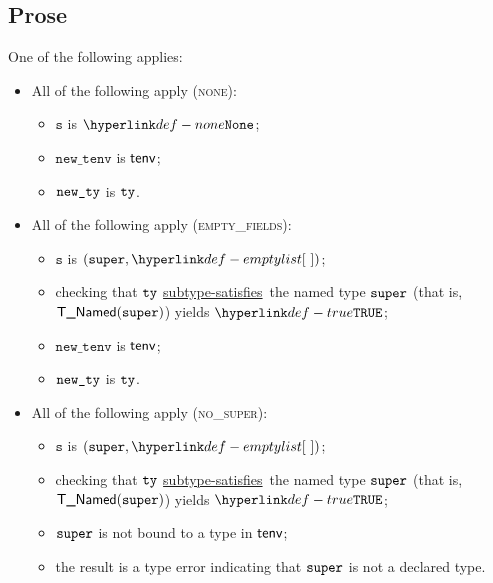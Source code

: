 \documentclass{book}
\newcommand\ProseOrTypeError[0]{\ProseTerminateAs{\TypeErrorConfig}}
\newcommand\subtypesatisfies[0]{\hyperlink{def-subtypesatisfies}{subtype-satisfies}}
\newcommand\newtenv[0]{\texttt{new\_tenv}}
\newcommand\vs[0]{\texttt{s}}
\begin{document}
\subsection{Prose}
One of the following applies:
\begin{itemize}
  \item All of the following apply (\textsc{none}):
  \begin{itemize}
    \item $\vs$ is $\None$;
    \item $\newtenv$ is $\textsf{tenv}$;
    \item $\texttt{new\_ty}$ is $\texttt{ty}$.
  \end{itemize}

  \item All of the following apply (\textsc{empty\_fields}):
  \begin{itemize}
    \item $\vs$ is $(\vsuper, \emptylist)$;
    \item checking that $\texttt{ty}$ \subtypesatisfies\ the named type $\texttt{super}$ (that is, \\ $\textsf{T\_Named}(\texttt{super})$) yields
          $\True$\ProseOrTypeError;
    \item $\newtenv$ is $\textsf{tenv}$;
    \item $\texttt{new\_ty}$ is $\texttt{ty}$.
  \end{itemize}

  \item All of the following apply (\textsc{no\_super}):
  \begin{itemize}
    \item $\vs$ is $(\vsuper, \emptylist)$;
    \item checking that $\texttt{ty}$ \subtypesatisfies\ the named type $\texttt{super}$ (that is, \\ $\textsf{T\_Named}(\texttt{super})$) yields
          $\True$\ProseOrTypeError;
    \item $\texttt{super}$ is not bound to a type in $\textsf{tenv}$;
    \item the result is a type error indicating that $\texttt{super}$ is not a declared type.
  \end{itemize}


\end{itemize}
\end{document}
